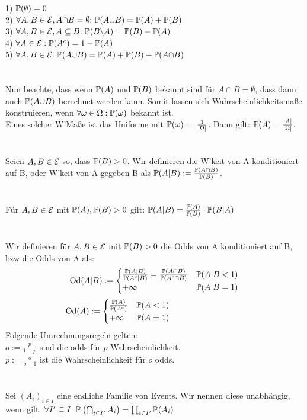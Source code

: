 1) \(\mathbb P(\emptyset) = 0\) \\
2) \(\forall A,B \in \mathcal E, A{\cap} B = \emptyset{:}\text{ } \mathbb P(A{\cup} B) = \mathbb P(A) + \mathbb P(B)\) \\
3) \(\forall A,B \in \mathcal E, A \subseteq B{:}\text{ } \mathbb P(B{\setminus} A) = \mathbb P(B) - \mathbb P(A)\) \\
4) \(\forall A \in \mathcal E: \mathbb P(A^c) = 1-\mathbb P(A)\) \\
5) \(\forall A,B \in \mathcal E {:}\text{ } \mathbb P(A{\cup} B) = \mathbb P(A) + \mathbb P(B) - \mathbb P(A{\cap}B)\) \\ \\
 \\
Nun beachte, dass wenn \(\mathbb P(A)\) und \(\mathbb P(B)\) bekannt sind für \(A{\cap}B = \emptyset\), dass dann auch \(\mathbb P(A{\cup}B)\) berechnet werden kann. Somit lassen sich Wahrscheinlichkeitsmaße konstruieren, wenn \(\forall \omega \in \Omega: \mathbb P(\omega)\) bekannt ist. \\
Eines solcher W'Maße ist das Uniforme mit \(\mathbb P(\omega) := \frac{1}{|\Omega|}\). Dann gilt: \(\mathbb P(A) = \frac{|A|}{|\Omega|}\). \\ \\
 \\
Seien \(A,B \in \mathcal E\) so, dass \(\mathbb P(B) > 0\). Wir definieren die W'keit von A konditioniert auf B, oder W'keit von A gegeben B als \(\mathbb P(A{|}B) := \frac{\mathbb P(A{\cap}B)}{\mathbb P(B)}\). \\ \\
 \\
Für \(A,B \in \mathcal E\) mit \(\mathbb P(A), \mathbb P(B) > 0\) gilt:
\(\mathbb P(A{|}B) = \frac{\mathbb P(A)}{\mathbb P(B)} \cdot \mathbb P(B{|}A)\) \\ \\
 \\
Wir definieren für \(A,B \in \mathcal E\) mit \(\mathbb P(B) > 0\) die Odds von A konditioniert auf B, bzw die Odds von A als:
\[\text{Od}(A{|}B) := \begin{cases}
    \frac{\mathbb P(A{|}B)}{\mathbb P(A^c{|}B)} = \frac{\mathbb P(A{\cap}B)}{\mathbb P(A^c{\cap}B)} & \mathbb P(A{|}B < 1) \\ +\infty & \mathbb P(A{|}B = 1)
\end{cases}\]
\[\text{Od}(A) := \begin{cases}
    \frac{\mathbb P(A)}{\mathbb P(A^c)} & \mathbb P(A < 1) \\ +\infty & \mathbb P(A = 1)
\end{cases} \text{ }\text{ }\text{ }\text{ }\text{ }\text{ }\text{ }\text{ }\text{ }\text{ }\text{ }\text{ }\text{ }\text{ }\text{ }\text{ }\text{ }\text{ }\text{ }\text{ }\text{ }\text{ }\text{ }\text{ }\text{ }\text{ }\]
Folgende Umrechnungsregeln gelten: \\
\(o := \frac{p}{1-p}\) sind die odds für \(p\) Wahrscheinlichkeit. \\
\(p := \frac{o}{o+1}\) ist die Wahrscheinlichkeit für \(o\) odds. \\ \\
 \\
Sei \((A_i)_{i \in I}\) eine endliche Familie von Events. Wir nennen diese unabhängig, wenn gilt: \(\forall I'\subseteq I{:}\text{ } \mathbb P\left(\bigcap_{i \in I'}A_i\right) = \prod_{i \in I'}\mathbb P(A_i)\)
